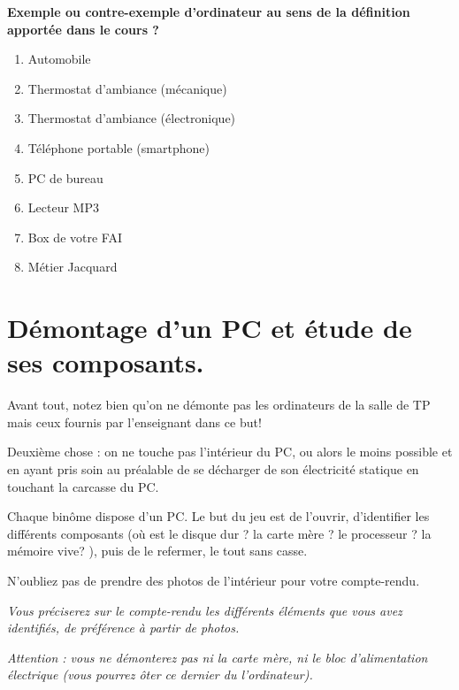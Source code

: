 \begin{exemple}[]
\textbf{Exemple ou contre-exemple d'ordinateur au sens de la définition apportée dans le cours ?}

\begin{minipage}{0.4\textwidth}
\begin{enumerate}
\item Automobile
\item Thermostat d'ambiance (mécanique)
\item Thermostat d'ambiance (électronique)
\item Téléphone portable (smartphone)
\item PC de bureau
\item Lecteur MP3
\item Box de votre FAI
\item Métier Jacquard
\end{enumerate}

\end{minipage}
\begin{minipage}{0.5\textwidth}
\begin{center}
\end{center}
\end{minipage}
\end{exemple}


\section{Démontage d'un PC et étude de ses composants.}\label{sec.demontage}

Avant tout, notez bien qu'on ne démonte pas les ordinateurs de la
salle de TP mais ceux fournis par l'enseignant dans ce but!

Deuxième chose : on ne touche pas l'intérieur du PC, ou alors le moins
possible et  en ayant pris  soin au préalable  de se décharger  de son
électricité statique en touchant la carcasse du PC.

Chaque  binôme  dispose  d'un PC.  Le  but  du  jeu est  de  l'ouvrir,
d'identifier  les différents  composants (où  est le  disque dur ? la
carte mère ? le processeur ?  la mémoire vive? ), puis de le refermer,
le tout sans casse.

N'oubliez pas de prendre des photos de l'intérieur pour votre
compte-rendu.

\emph{Vous préciserez sur le compte-rendu les différents éléments
  que vous avez identifiés, de préférence à partir de photos.}

\emph{Attention : vous ne démonterez pas ni la carte mère, ni le bloc d'alimentation électrique (vous pourrez ôter ce dernier du l'ordinateur).}  
